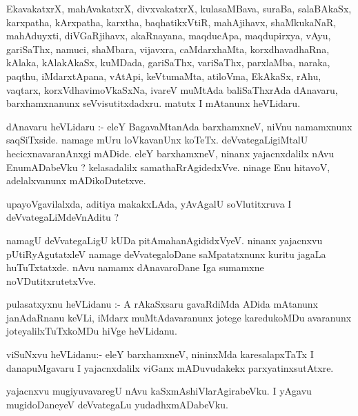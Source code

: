 \documentclass{article}
\begin{document}
\begin{mn}
EkavakatxrX,  mahAvakatxrX,  divxvakatxrX,  kulasaMBava,  suraBa,  salaBAkaSx,  
karxpatha,  kArxpatha,   karxtha,  baqhatikxVtiR,  mahAjihavx,  shaMkukaNaR,  
mahAduyxti,  diVGaRjihavx, akaRnayana, maqducApa,  maqdupirxya,  vAyu,  gariSaThx,  
namuci,  shaMbara,  vijavxra,  caMdarxhaMta,  korxdhavadhaRna,  kAlaka,  kAlakAkaSx,  
kuMDada,  gariSaThx,  variSaThx,  parxlaMba,  naraka,  paqthu,  iMdarxtApana,  vAtApi,  
keVtumaMta,  atiloVma,  EkAkaSx,  rAhu,  vaqtarx,  korxVdhavimoVkaSxNa,  ivareV  muMtAda  
baliSaThxrAda  dAnavaru,  barxhamxnanunx  seVvisutitxdadxru.  matutx  I mAtanunx  heVLidaru.
\end{mn}

\begin{mn}
dAnavaru  heVLidaru :- eleY  BagavaMtanAda  barxhamxneV,  niVnu  namamxnunx  saqSiTxside.  
namage  mUru  loVkavanUnx  koTeTx.  deVvategaLigiMtalU  hecicxnavaranAnxgi  mADide.  eleY  
barxhamxneV,  ninanx  yajacnxdalilx  nAvu EnumADabeVku ?  kelasadalilx  samathaRrAgidedxVve.  
ninage  Enu  hitavoV, adelalxvanunx  mADikoDutetxve.
\end{mn}

\begin{mn}
upayoVgavilalxda,  aditiya  makakxLAda,  yAvAgalU  soVlutitxruva  I  deVvategaLiMdeVnAditu ?
\end{mn}

\begin{mn}
namagU  deVvategaLigU  kUDa  pitAmahanAgididxVyeV.  ninanx  yajacnxvu  pUtiRyAgutatxleV  
namage  deVvategaloDane  saMpatatxnunx  kuritu  jagaLa  huTuTxtatxde.  nAvu  namamx  
dAnavaroDane  Iga  sumamxne  noVDutitxrutetxVve.
\end{mn}

\begin{mn}
pulasatxyxnu  heVLidanu :- A  rAkaSxsaru  gavaRdiMda  ADida  mAtanunx  janAdaRnanu  keVLi,  
iMdarx  muMtAdavaranunx  jotege  karedukoMDu  avaranunx  joteyalilxTuTxkoMDu  hiVge  heVLidanu.
\end{mn}

\begin{mn}
viSuNxvu heVLidanu:- eleY  barxhamxneV,  nininxMda  karesalapxTaTx  I  danapuMgavaru  
I  yajacnxdalilx  viGanx mADuvudakekx  parxyatinxsutAtxre.  
\end{mn}

\begin{mn}
yajacnxvu  mugiyuvavaregU  nAvu  kaSxmAshiVlarAgirabeVku.  I yAgavu  mugidoDaneyeV  
deVvategaLu  yudadhxmADabeVku.
\end{mn}
\end{document}
